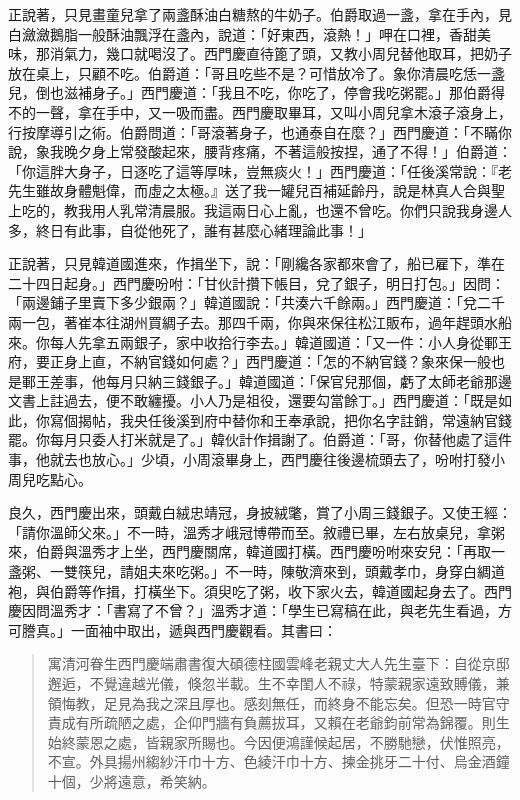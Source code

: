 正說著，只見畫童兒拿了兩盞酥油白糖熬的牛奶子。伯爵取過一盞，拿在手內，見白瀲瀲鵝脂一般酥油飄浮在盞內，說道：「好東西，滾熱！」呷在口裡，香甜美味，那消氣力，幾口就喝沒了。西門慶直待篦了頭，又教小周兒替他取耳，把奶子放在桌上，只顧不吃。伯爵道：「哥且吃些不是？可惜放冷了。象你清晨吃恁一盞兒，倒也滋補身子。」西門慶道：「我且不吃，你吃了，停會我吃粥罷。」那伯爵得不的一聲，拿在手中，又一吸而盡。西門慶取畢耳，又叫小周兒拿木滾子滾身上，行按摩導引之術。伯爵問道：「哥滾著身子，也通泰自在麼？」西門慶道：「不瞞你說，象我晚夕身上常發酸起來，腰背疼痛，不著這般按捏，通了不得！」伯爵道：「你這胖大身子，日逐吃了這等厚味，豈無痰火！」西門慶道：「任後溪常說：『老先生雖故身體魁偉，而虛之太極。』送了我一罐兒百補延齡丹，說是林真人合與聖上吃的，教我用人乳常清晨服。我這兩日心上亂，也還不曾吃。你們只說我身邊人多，終日有此事，自從他死了，誰有甚麼心緒理論此事！」

正說著，只見韓道國進來，作揖坐下，說：「剛纔各家都來會了，船已雇下，準在二十四日起身。」西門慶吩咐：「甘伙計攢下帳目，兌了銀子，明日打包。」因問：「兩邊鋪子里賣下多少銀兩？」韓道國說：「共湊六千餘兩。」西門慶道：「兌二千兩一包，著崔本往湖州買綢子去。那四千兩，你與來保往松江販布，過年趕頭水船來。你每人先拿五兩銀子，家中收拾行李去。」韓道國道：「又一件：小人身從鄆王府，要正身上直，不納官錢如何處？」西門慶道：「怎的不納官錢？象來保一般也是鄆王差事，他每月只納三錢銀子。」韓道國道：「保官兒那個，虧了太師老爺那邊文書上註過去，便不敢纏擾。小人乃是祖役，還要勾當餘丁。」西門慶道：「既是如此，你寫個揭帖，我央任後溪到府中替你和王奉承說，把你名字註銷，常遠納官錢罷。你每月只委人打米就是了。」韓伙計作揖謝了。伯爵道：「哥，你替他處了這件事，他就去也放心。」少頃，小周滾畢身上，西門慶往後邊梳頭去了，吩咐打發小周兒吃點心。

良久，西門慶出來，頭戴白絨忠靖冠，身披絨氅，賞了小周三錢銀子。又使王經：「請你溫師父來。」不一時，溫秀才峨冠博帶而至。敘禮已畢，左右放桌兒，拿粥來，伯爵與溫秀才上坐，西門慶關席，韓道國打橫。西門慶吩咐來安兒：「再取一盞粥、一雙筷兒，請姐夫來吃粥。」不一時，陳敬濟來到，頭戴孝巾，身穿白綢道袍，與伯爵等作揖，打橫坐下。須臾吃了粥，收下家火去，韓道國起身去了。西門慶因問溫秀才：「書寫了不曾？」溫秀才道：「學生已寫稿在此，與老先生看過，方可謄真。」一面袖中取出，遞與西門慶觀看。其書曰：
\begin{quote}
寓清河眷生西門慶端肅書復大碩德柱國雲峰老親丈大人先生臺下：自從京邸邂逅，不覺違越光儀，倏忽半載。生不幸閨人不祿，特蒙親家遠致賻儀，兼領悔教，足見為我之深且厚也。感刻無任，而終身不能忘矣。但恐一時官守責成有所疏陋之處，企仰門牆有負薦拔耳，又賴在老爺鈞前常為錦覆。則生始終蒙恩之處，皆親家所賜也。今因便鴻謹候起居，不勝馳戀，伏惟照亮，不宣。外具揚州縐紗汗巾十方、色綾汗巾十方、揀金挑牙二十付、烏金酒鐘十個，少將遠意，希笑納。
\end{quote}

